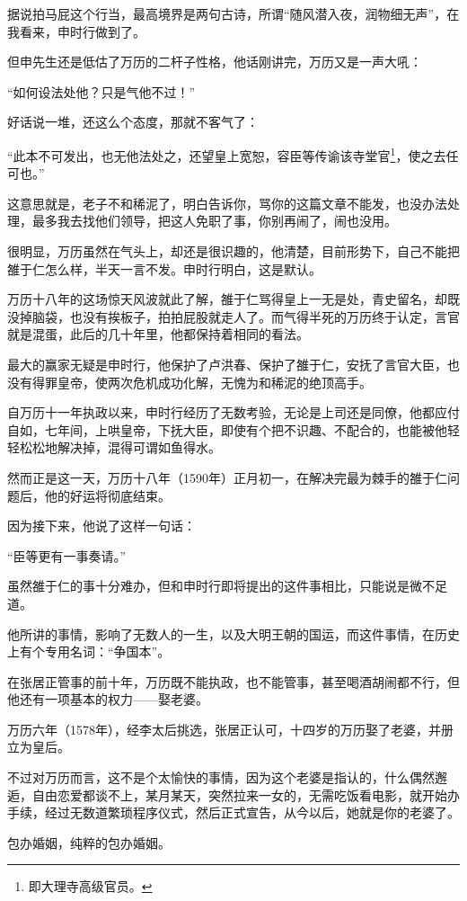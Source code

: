 \begin{multicols}{\theparacolNo}
据说拍马屁这个行当，最高境界是两句古诗，所谓“随风潜入夜，润物细无声”，在我看来，申时行做到了。

但申先生还是低估了万历的二杆子性格，他话刚讲完，万历又是一声大吼：

“如何设法处他？只是气他不过！”

好话说一堆，还这么个态度，那就不客气了：

“此本不可发出，也无他法处之，还望皇上宽恕，容臣等传谕该寺堂官\footnote{即大理寺高级官员。}，使之去任可也。”

这意思就是，老子不和稀泥了，明白告诉你，骂你的这篇文章不能发，也没办法处理，最多我去找他们领导，把这人免职了事，你别再闹了，闹也没用。

很明显，万历虽然在气头上，却还是很识趣的，他清楚，目前形势下，自己不能把雒于仁怎么样，半天一言不发。申时行明白，这是默认。

万历十八年的这场惊天风波就此了解，雒于仁骂得皇上一无是处，青史留名，却既没掉脑袋，也没有挨板子，拍拍屁股就走人了。而气得半死的万历终于认定，言官就是混蛋，此后的几十年里，他都保持着相同的看法。

最大的赢家无疑是申时行，他保护了卢洪春、保护了雒于仁，安抚了言官大臣，也没有得罪皇帝，使两次危机成功化解，无愧为和稀泥的绝顶高手。

自万历十一年执政以来，申时行经历了无数考验，无论是上司还是同僚，他都应付自如，七年间，上哄皇帝，下抚大臣，即使有个把不识趣、不配合的，也能被他轻轻松松地解决掉，混得可谓如鱼得水。

然而正是这一天，万历十八年（1590年）正月初一，在解决完最为棘手的雒于仁问题后，他的好运将彻底结束。

因为接下来，他说了这样一句话：

“臣等更有一事奏请。”

虽然雒于仁的事十分难办，但和申时行即将提出的这件事相比，只能说是微不足道。

他所讲的事情，影响了无数人的一生，以及大明王朝的国运，而这件事情，在历史上有个专用名词：“争国本”。

在张居正管事的前十年，万历既不能执政，也不能管事，甚至喝酒胡闹都不行，但他还有一项基本的权力——娶老婆。

万历六年（1578年），经李太后挑选，张居正认可，十四岁的万历娶了老婆，并册立为皇后。

不过对万历而言，这不是个太愉快的事情，因为这个老婆是指认的，什么偶然邂逅，自由恋爱都谈不上，某月某天，突然拉来一女的，无需吃饭看电影，就开始办手续，经过无数道繁琐程序仪式，然后正式宣告，从今以后，她就是你的老婆了。

包办婚姻，纯粹的包办婚姻。


\end{multicols}

